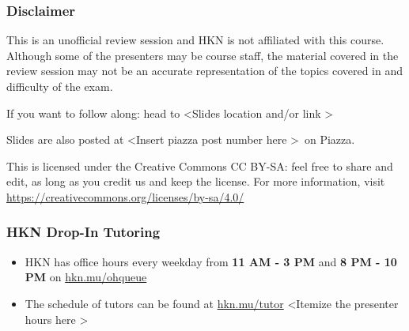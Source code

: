 \providecommand{\SlideAccessingLogistics}{\textless Insert piazza post number here \textgreater}
\providecommand{\SlidesLocation}{\textless Slides location and/or link \textgreater}
\providecommand{\PresenterHours}{\textless Itemize the presenter hours here \textgreater}

\begin{frame}

\titlepage

\end{frame}

\begin{frame}[t]\vspace{20pt}
\frametitle{Disclaimer}
This is an unofficial review session and HKN is not affiliated with this course. Although some of the presenters may be course staff, the material covered in the review session may not be an accurate representation of the topics covered in and difficulty of the exam.

If you want to follow along: head to \SlidesLocation

Slides are also posted at \SlideAccessingLogistics\ on Piazza.

\begin{footnotesize}
  This is licensed under the Creative Commons CC BY-SA: feel free to share and edit, as long as you credit us and keep the license. For more information, visit
  \href{https://creativecommons.org/licenses/by-sa/4.0/}{https://creativecommons.org/licenses/by-sa/4.0/}
\end{footnotesize}

\vspace{20pt}

\end{frame}


\begin{frame}[t]\vspace{20pt}
\frametitle{HKN Drop-In Tutoring}

\begin{itemize}
  \item HKN has office hours every weekday from \textbf{11 AM - 3 PM} and \textbf{8 PM - 10 PM} on \href{https://hkn.mu/ohqueue}{hkn.mu/ohqueue}
  \item The schedule of tutors can be found at \href{https://hkn.mu/tutor}{hkn.mu/tutor}
  \PresenterHours
\end{itemize}

\end{frame}
